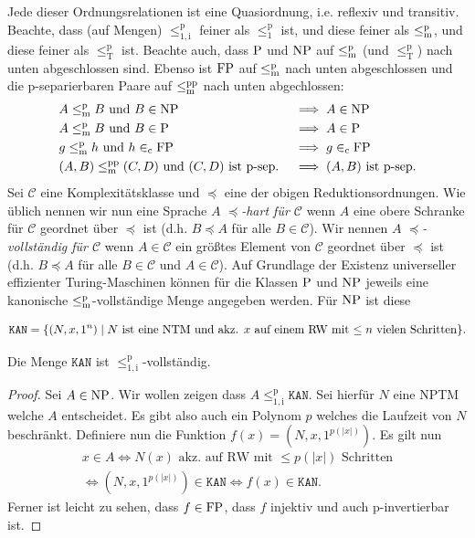 Jede dieser Ordnungsrelationen ist eine Quasiordnung, i.e. reflexiv und transitiv.
Beachte, dass (auf Mengen) $\leq_\mathrm{1,i}^\mathrm{p}$ feiner als $\leq_1^\mathrm{p}$ ist, und diese feiner als $\leqmp$, und diese feiner als $\leq_\mathrm{T}^\mathrm p$ ist.
Beachte auch, dass $\P$ und $\NP$ auf $\leqmp$ (und $\leq_\mathrm T^\mathrm p$) nach unten abgeschlossen sind.
Ebenso ist $\FP$ auf $\leqmp$ nach unten abgeschlossen und die p-separierbaren Paare auf $\leqmpp$ nach unten abgechlossen:
\begin{alignat*}{2}
    &A\leqmp B \text{ und } B\in\NP &&\implies A\in\NP\\
    &A\leqmp B \text{ und } B\in\P &&\implies A\in\P\\
    &g\leqmp h \text{ und } h\inc\FP &&\implies g\inc\FP\\
    &(A,B)\leqmpp (C,D) \text{ und $(C,D)$ ist p-sep.} &&\implies \text{$(A,B)$ ist p-sep.}
\end{alignat*}
Sei $\mathcal C$ eine Komplexitätsklasse und $\preceq$ eine der obigen Reduktionsordnungen.
Wie üblich nennen wir nun eine Sprache $A$ \emph{$\preceq$-hart für $\mathcal C$} wenn $A$ eine obere Schranke für $\mathcal C$ geordnet über $\preceq$  ist (d.h. $B\preceq A$ für alle $B\in\mathcal C$).
Wir nennen $A$ \emph{$\preceq$-vollständig für $\mathcal C$} wenn $A\in\mathcal C$ ein größtes Element von $\mathcal C$ geordnet über $\preceq$ ist (d.h. $B\preceq A$ für alle $B\in\mathcal C$ und $A\in\mathcal C$).
Auf Grundlage der Existenz universeller effizienter Turing-Maschinen können für die Klassen $\P$ und $\NP$ jeweils eine kanonische $\leqmp$-vollständige Menge angegeben werden. Für $\NP$ ist diese
\begin{definition}
\[ \mathtt{KAN} = \{ (N, x, 1^n) \mid \text{$N$ ist eine NTM und akz. $x$ auf einem RW mit $\leq n$ vielen Schritten} \}.\qedhere \]
\end{definition}
\begin{lemma}
    Die Menge $\mathtt{KAN}$ ist $\leq_\mathrm{1,i}^\mathrm{p}$-vollständig.
\end{lemma}
\begin{proof}
    Sei $A\in\NP$. Wir wollen zeigen dass $A \leq_\mathrm{1,i}^\mathrm{p} \mathtt{KAN}$. Sei hierfür $N$ eine NPTM welche $A$ entscheidet. Es gibt also auch ein Polynom $p$ welches die Laufzeit von $N$ beschränkt.
    Definiere nun die Funktion $f(x) = (N, x, 1^{p(|x|)})$. Es gilt nun
    \begin{gather*}
        x\in A \iff N(x)\text{ akz. auf RW mit $\leq p(|x|)$ Schritten}\\
        \iff (N, x, 1^{p(|x|)}) \in \mathtt{KAN} \iff f(x) \in \mathtt{KAN}.
    \end{gather*}
    Ferner ist leicht zu sehen, dass $f\in \FP$, dass $f$ injektiv und auch p-invertierbar ist.
\end{proof}


